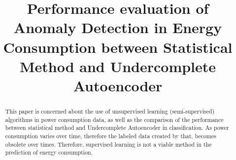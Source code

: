 \documentclass[conference]{IEEEtran}
\begin{document}
\title{Performance evaluation of Anomaly Detection in Energy Consumption between Statistical Method and Undercomplete Autoencoder\\
}

\author{
\and
{}
\and
{}

}

\maketitle

\begin{abstract}
This paper is concerned about the use of unsupervised learning (semi-supervised) algorithms in power consumption data, as well as the comparison of the performance between statistical method and Undercomplete Autoencoder in classification. As power consumption varies over time, therefore the labeled data created by that, becomes obsolete over times. Therefore, supervised learning is not a viable method in the prediction of energy consumption.

\end{abstract}

\end{document}
